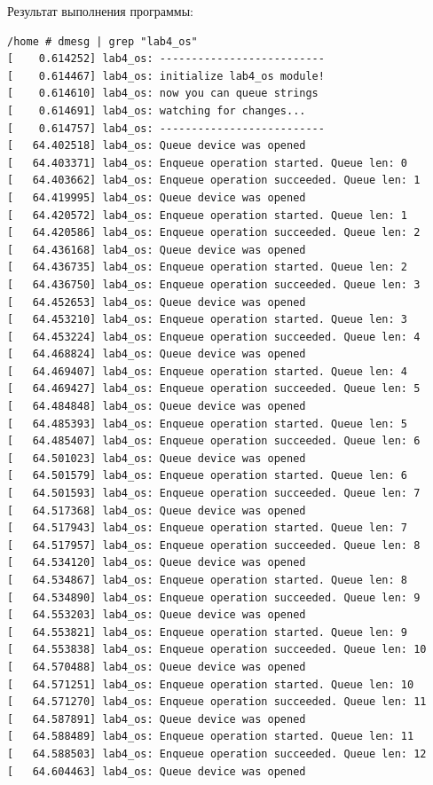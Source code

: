 \documentclass[a4paper,14pt]{extarticle}
\begin{document}
Результат выполнения программы:\\
\begin{verbatim}
/home # dmesg | grep "lab4_os"
[    0.614252] lab4_os: --------------------------
[    0.614467] lab4_os: initialize lab4_os module!
[    0.614610] lab4_os: now you can queue strings
[    0.614691] lab4_os: watching for changes...
[    0.614757] lab4_os: --------------------------
[   64.402518] lab4_os: Queue device was opened
[   64.403371] lab4_os: Enqueue operation started. Queue len: 0
[   64.403662] lab4_os: Enqueue operation succeeded. Queue len: 1
[   64.419995] lab4_os: Queue device was opened
[   64.420572] lab4_os: Enqueue operation started. Queue len: 1
[   64.420586] lab4_os: Enqueue operation succeeded. Queue len: 2
[   64.436168] lab4_os: Queue device was opened
[   64.436735] lab4_os: Enqueue operation started. Queue len: 2
[   64.436750] lab4_os: Enqueue operation succeeded. Queue len: 3
[   64.452653] lab4_os: Queue device was opened
[   64.453210] lab4_os: Enqueue operation started. Queue len: 3
[   64.453224] lab4_os: Enqueue operation succeeded. Queue len: 4
[   64.468824] lab4_os: Queue device was opened
[   64.469407] lab4_os: Enqueue operation started. Queue len: 4
[   64.469427] lab4_os: Enqueue operation succeeded. Queue len: 5
[   64.484848] lab4_os: Queue device was opened
[   64.485393] lab4_os: Enqueue operation started. Queue len: 5
[   64.485407] lab4_os: Enqueue operation succeeded. Queue len: 6
[   64.501023] lab4_os: Queue device was opened
[   64.501579] lab4_os: Enqueue operation started. Queue len: 6
[   64.501593] lab4_os: Enqueue operation succeeded. Queue len: 7
[   64.517368] lab4_os: Queue device was opened
[   64.517943] lab4_os: Enqueue operation started. Queue len: 7
[   64.517957] lab4_os: Enqueue operation succeeded. Queue len: 8
[   64.534120] lab4_os: Queue device was opened
[   64.534867] lab4_os: Enqueue operation started. Queue len: 8
[   64.534890] lab4_os: Enqueue operation succeeded. Queue len: 9
[   64.553203] lab4_os: Queue device was opened
[   64.553821] lab4_os: Enqueue operation started. Queue len: 9
[   64.553838] lab4_os: Enqueue operation succeeded. Queue len: 10
[   64.570488] lab4_os: Queue device was opened
[   64.571251] lab4_os: Enqueue operation started. Queue len: 10
[   64.571270] lab4_os: Enqueue operation succeeded. Queue len: 11
[   64.587891] lab4_os: Queue device was opened
[   64.588489] lab4_os: Enqueue operation started. Queue len: 11
[   64.588503] lab4_os: Enqueue operation succeeded. Queue len: 12
[   64.604463] lab4_os: Queue device was opened

\end{verbatim}
\end{document}
